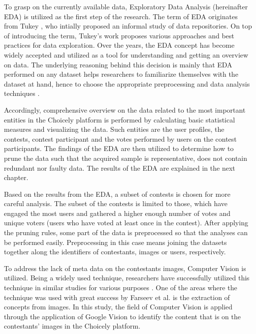 To grasp on the currently available data, Exploratory Data Analysis (hereinafter EDA) is utilized as the first step of the research. The term of EDA originates from Tukey \cite{tukey77}, who intially proposed an informal study of data repositories. On top of introducing the term, Tukey's work proposes various approaches and best practices for data exploration. Over the years, the EDA concept has become widely accepted and utilized as a tool for understanding and getting an overview on data. The underlying reasoning behind this decision is mainly that EDA performed on any dataset helps researchers to familiarize themselves with the dataset at hand, hence to choose the appropriate preprocessing and data analysis techniques \cite{tukey77, introtodatamining}. 

Accordingly, comprehensive overview on the data related to the most important entities in the Choicely platform is performed by calculating basic statistical measures and visualizing the data. Such entities are the user profiles, the contests, contest participant and the votes performed by users on the contest participants. The findings of the EDA are then utilized to determine how to prune the data such that the acquired sample is representative, does not contain redundant nor faulty data. The results of the EDA are explained in the next chapter. 

Based on the results from the EDA, a subset of contests is chosen for more careful analysis. The subset of the contests is limited to those, which have engaged the most users and gathered a higher enough number of votes and unique voters (users who have voted at least once in the contest). After applying the pruning rules, some part of the data is preprocessed so that the analyses can be performed easily. Preprocessing in this case means joining the datasets together along the identifiers of contestants, images or users, respectively.  

To address the lack of meta data on the contestants images, Computer Vision is utilized. Being a widely used technique, researchers have successfully utilized this technique in similar studies for various purposes \cite{hu2014we, farseev2015harvestingmultiplesources, han2016teensarefrommars, bakhshi2014faces}. One of the areas where the technique was used with great success by Farseev et al. \cite{farseev2015harvestingmultiplesources} is the extraction of concepts from images. In this study, the field of Computer Vision is applied through the application of Google Vision to identify the content that is on the contestants' images in the Choicely platform. 

